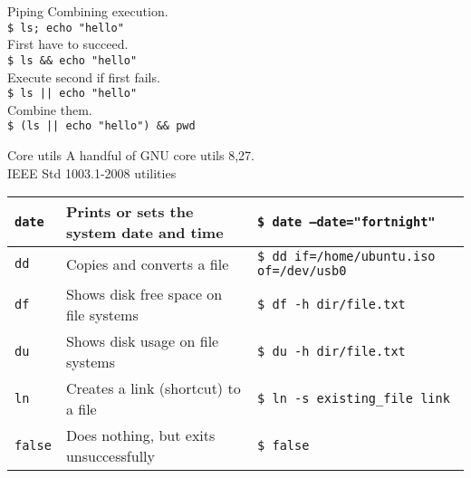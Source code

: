 \documentclass{beamer}
\let\tt\texttt
\begin{document}
\begin{frame}{Piping}
        Combining execution.     \\
        \tt{\$ ls; echo "hello"}        \\

        First have to succeed.    \\
        \tt{\$ ls \&\& echo "hello"}        \\

        Execute second if first fails.    \\
        \tt{\$ ls || echo "hello"}        \\

        Combine them.    \\
        \tt{\$ (ls || echo "hello") \&\& pwd}        \\
\end{frame}

\begin{frame}{Core utils}
        A handful of GNU core utils 8,27. \\
        IEEE Std 1003.1-2008 utilities \\
        \begin{tabular}{p{} p{} | p{}}
                \hline
                \tt{date}             &
                Prints or sets the system date and time &
                \tt{\$ date --date="fortnight"}       \\
                \hline
                \tt{dd}             &
                Copies and converts a file  &
                \tt{\$ dd if=/home/ubuntu.iso of=/dev/usb0}       \\
                \hline
                \tt{df}             &
                Shows disk free space on file systems   &
                \tt{\$ df -h dir/file.txt}       \\
                \hline
                \tt{du}             &
                Shows disk usage on file systems &
                \tt{\$ du -h dir/file.txt}       \\
                \hline
                \tt{ln}             &
                Creates a link (shortcut) to a file &
                \tt{\$ ln -s existing\_file link}       \\
                \hline
                \tt{false}             &
                Does nothing, but exits unsuccessfully &
                \tt{\$ false}       \\
                \hline
        \end{tabular}
\end{frame}
\end{document}
